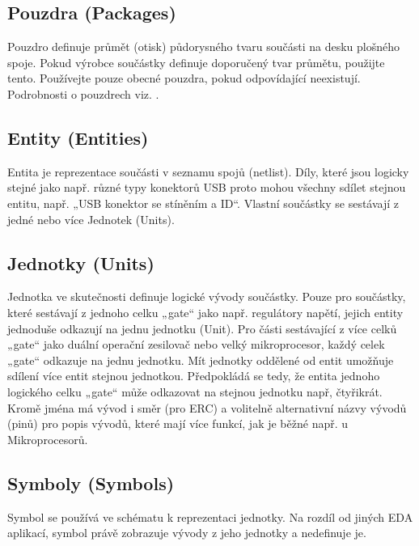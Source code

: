 \documentclass[letterpaper,10pt,czech]{sphinxmanual}
\begin{document}
\subsection{Pouzdra (Packages)}
\label{\detokenize{pool-elements:pouzdra-packages}}
Pouzdro definuje průmět (otisk) půdorysného tvaru součásti na desku plošného spoje. Pokud výrobce součástky
definuje doporučený tvar průmětu, použijte tento. Používejte pouze
obecné pouzdra, pokud odpovídající neexistují. Podrobnosti o pouzdrech viz.
{\hyperref[\detokenize{create-package::doc}]{}}.


\subsection{Entity (Entities)}
\label{\detokenize{pool-elements:entity-entities}}
Entita je reprezentace součásti v seznamu spojů (netlist). Díly, které jsou logicky
stejné jako např. různé typy konektorů USB proto mohou všechny sdílet
stejnou entitu, např. „USB konektor se stíněním a ID“. Vlastní součástky se sestávají z jedné nebo více Jednotek (Units).


\subsection{Jednotky (Units)}
\label{\detokenize{pool-elements:jednotky-units}}
Jednotka ve skutečnosti definuje logické vývody součástky. Pouze pro součástky, které
sestávají z jednoho celku „gate“ jako např. regulátory napětí, jejich entity jednoduše
odkazují na jednu jednotku (Unit). Pro části sestávající z více celků „gate“ jako
duální operační zesilovač nebo velký mikroprocesor, každý celek „gate“ odkazuje na jednu jednotku.
Mít jednotky oddělené od entit umožňuje sdílení více entit
stejnou jednotkou. Předpokládá se tedy, že entita jednoho logického celku „gate“ může odkazovat na stejnou jednotku např, čtyřikrát. Kromě jména má vývod i směr (pro ERC) a volitelně alternativní názvy vývodů (pinů) pro popis vývodů, které mají více funkcí, jak je běžné např. u Mikroprocesorů.


\subsection{Symboly (Symbols)}
\label{\detokenize{pool-elements:symboly-symbols}}
Symbol se používá ve schématu k reprezentaci jednotky. Na rozdíl od jiných
EDA aplikací, symbol právě zobrazuje vývody z jeho jednotky a nedefinuje je.
\end{document}
